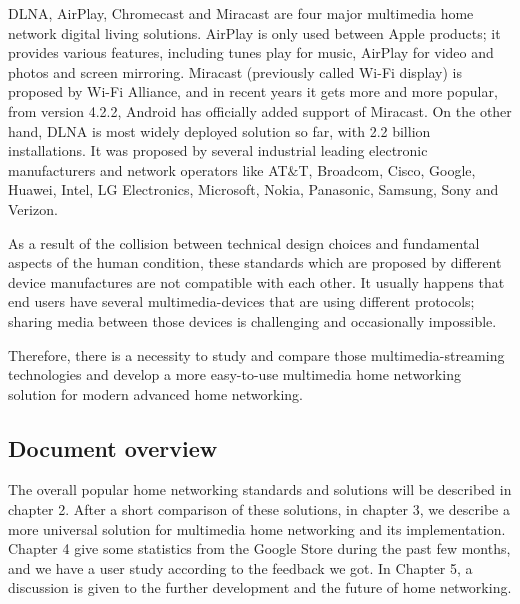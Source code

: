 DLNA, AirPlay, Chromecast and Miracast are four major multimedia home network
digital living solutions. AirPlay is only used between Apple products; it
provides various features, including tunes play for music, AirPlay for video
and photos and screen mirroring. Miracast (previously called Wi-Fi display) is
proposed by Wi-Fi Alliance, and in recent years it gets more and more popular,
from version 4.2.2, Android has officially added support of Miracast. On the
other hand, DLNA is most widely deployed solution so far, with 2.2 billion installations.
It was proposed by several industrial leading electronic manufacturers and network operators 
like AT$\&$T, Broadcom, Cisco, Google, Huawei, Intel, LG Electronics, Microsoft, Nokia, 
Panasonic, Samsung, Sony and Verizon.

As a result of the collision between technical design choices and fundamental
aspects of the human condition, these standards which are proposed by
different device manufactures are not compatible with each other. It usually happens that
end users have several multimedia-devices that are using different protocols;
sharing media between those devices is challenging and occasionally impossible. 

Therefore, there is a necessity to study and compare those multimedia-streaming
technologies and develop a more easy-to-use multimedia home networking solution
for modern advanced home networking.

\subsection{Document overview}
The overall popular home networking standards and solutions will be described in
chapter 2. After a short comparison of these solutions, in chapter 3, we
describe a more universal solution for multimedia home networking and its
implementation. Chapter 4 give some statistics from the Google Store
during the past few months, and we have a user study according to the feedback
we got. In Chapter 5, a discussion is given to the further development and the
future of home networking.

